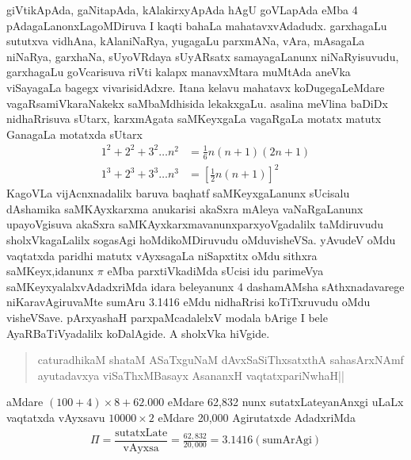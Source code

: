 giVtikApAda, gaNitapAda, kAlakirxyApAda hAgU goVLapAda eMba {\rm 4} pAdagaLanonxLagoMDiruva I kaqti bahaLa mahatavxvAdadudx. garxhagaLu sututxva vidhAna, kAla\-niNaRya, yugagaLu parxmANa, vAra, mAsagaLa niNaRya, garxhaNa, sUyoVRdaya sUyARsatx samayagaLanunx niNaRyisuvudu, garxhagaLu goVcarisuva riVti kalapx manavxM\-tara muMtAda aneVka viSayagaLa bagegx vivarisidAdxre. Itana kelavu mahatavx koDugegaLeMdare vagaRsamiVkaraNakekx saMbaMdhisida lekakxgaLu. asalina meVlina baDiDx nidhaRrisuva sUtarx, karxmAgata saMKeyxgaLa vagaRgaLa motatx matutx GanagaLa motatxda sUtarx
\begin{align*}
1^{2}+2^{2}+3^{2}\ldots n^{2}&
=\frac{1}{6}n(n+1)(2n+1)\\
1^{3}+2^{3}+3^{3}\ldots n^{3} &
=\left[\frac{1}{2}n(n+1)\right]^{2}
\end{align*}
KagoVLa vijAcnxnadalilx baruva baqhatf saMKeyxgaLanunx sUcisalu dAshamika saMKAyxkarxma anukarisi akaSxra mAleya vaNaRgaLanunx upayoVgisuva akaSxra saMKAyxkarxmavanunx\break parxyoVgadalilx taMdiruvudu sholxVkagaLalilx sogasAgi hoMdikoMDiruvudu oMdu\break visheVSa. yAvudeV oMdu vaqtatxda paridhi matutx vAyxsagaLa niSapxtitx oMdu sithxra saMKeyx,\break idanunx $\pi$ eMba parxtiVkadiMda sUcisi idu parimeVya saMKeyxyalalxvAdadxriMda idara beleyanunx {\rm 4} dashamAMsha sAthxnadavarege niKaravAgiruvaMte sumAru {\rm 3.1416} eMdu nidhaRrisi koTiTxruvudu oMdu visheVSave. pArxyashaH parxpaMcadalelxV modala bArige I bele AyaRBaTiVyadalilx koDalAgide. A sholxVka hiVgide.
 
\begin{verse}
caturadhikaM shataM ASaTxguNaM dAvxSaSiThxsatxthA sahasArxNAmf\\
ayutadavxya viSaThxMBasayx AsananxH vaqtatxpariNwhaH||
\end{verse}

aMdare\; $(100+4) \times 8+62.000$\; eMdare {\rm 62,832} nunx sutatxLateyanAnxgi uLaLx vaqtatxda vAyxsavu\; $10000 \times 2$\; eMdare {\rm 20,000} Agirutatxde AdadxriMda
\begin{align*}
\Pi=\dfrac{\text{sutatxLate}}{\text{vAyxsa}}=\frac{62,832}{20,000}=3.1416 (\text{sumArAgi})
\end{align*}

